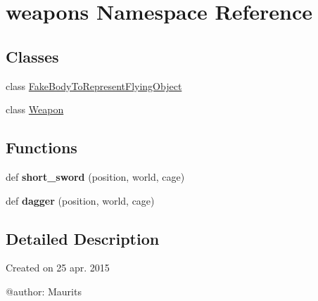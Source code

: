 \hypertarget{namespaceweapons}{}\section{weapons Namespace Reference}
\label{namespaceweapons}
\subsection*{Classes}
\begin{DoxyCompactItemize}
\item 
class \hyperlink{classweapons_1_1_fake_body_to_represent_flying_object}{Fake\+Body\+To\+Represent\+Flying\+Object}
\item 
class \hyperlink{classweapons_1_1_weapon}{Weapon}
\end{DoxyCompactItemize}
\subsection*{Functions}
\begin{DoxyCompactItemize}
\item 
\hypertarget{namespaceweapons_afb81cf11bf0abaeb744b5944017c6cc0}{}def {\bfseries short\+\_\+sword} (position, world, cage)\label{namespaceweapons_afb81cf11bf0abaeb744b5944017c6cc0}

\item 
\hypertarget{namespaceweapons_a3d6f8312d3c368debe41adb9aff1c986}{}def {\bfseries dagger} (position, world, cage)\label{namespaceweapons_a3d6f8312d3c368debe41adb9aff1c986}

\end{DoxyCompactItemize}


\subsection{Detailed Description}
\begin{DoxyVerb}Created on 25 apr. 2015

@author: Maurits
\end{DoxyVerb}
 